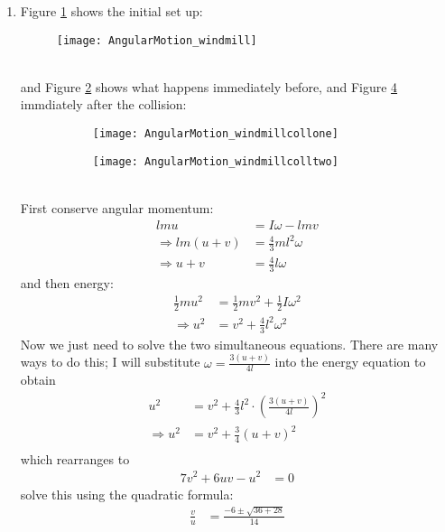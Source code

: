 \begin{hint}
{\begin{enumerate}
\item Figure \ref{fig:AngularMotion_windmill} shows the initial set up:
\begin{figure}[h] 
\centering
\texttt{[image: AngularMotion\_windmill]}
\caption{}
\label{fig:AngularMotion_windmill}
\end{figure}
\\
and Figure \ref{fig:AngularMotion_windmillcollone} shows what happens immediately before,  and Figure \ref{fig:AngularMotion_windmillcolltwo} immdiately after the collision:
\begin{figure}[h]
\centering
\begin{subfigure}{0.5\textwidth}
\centering
\texttt{[image: AngularMotion\_windmillcollone]}
\caption{}
\label{fig:AngularMotion_windmillcollone}
\end{subfigure}%
\begin{subfigure}{0.5\textwidth}
\centering
\texttt{[image: AngularMotion\_windmillcolltwo]}
\caption{}
\label{fig:AngularMotion_windmillcolltwo}
\end{subfigure}
\caption{}
\end{figure}
\\
First conserve angular momentum:
\begin{align*}
lmu&=I\omega-lmv \\
\Rightarrow lm(u+v)&=\frac{4}{3}ml^2\omega \\
\Rightarrow u+v&=\frac{4}{3}l\omega
\end{align*}
and then energy:
\begin{align*}
\frac{1}{2}mu^2&=\frac{1}{2}mv^2+\frac{1}{2}I\omega^2 \\
\Rightarrow u^2&=v^2+\frac{4}{3}l^2\omega^2
\end{align*}
Now we just need to solve the two simultaneous equations. There are many ways to do this; I will substitute $\omega=\frac{3(u+v)}{4l}$ into the energy equation to obtain
\begin{align*}
u^2&=v^2+\frac{4}{3}l^2\cdot\left(\frac{3(u+v)}{4l}\right)^2 \\
\Rightarrow u^2&=v^2+\frac{3}{4}(u+v)^2 \\
\end{align*}
which rearranges to
\begin{align*} 7v^2+6uv-u^2&=0 \end{align*}
solve this using the quadratic formula:
\begin{align*}
\frac{v}{u}&=\frac{-6\pm\sqrt{36+28}}{14} \\

\end{align*}
\end{enumerate}}
\end{hint}
